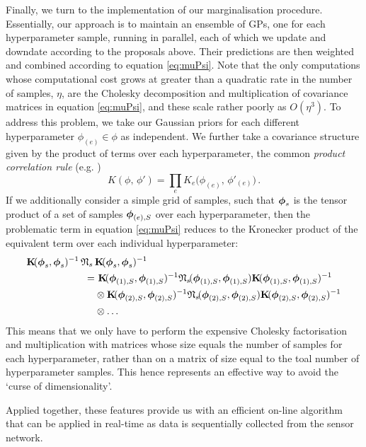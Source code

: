 \documentclass{acmtrans2m}
\begin{document}
Finally, we turn to the implementation of our marginalisation procedure. Essentially, our approach is to maintain an ensemble of GPs, one for each hyperparameter sample, running in parallel, each of which we update and downdate according to the proposals above. Their predictions are then weighted and combined according to equation \eqref{eq:muPsi}. Note that the only computations whose computational cost grows at greater than a quadratic rate in the number of samples, $\eta$, are the Cholesky decomposition and multiplication of covariance matrices in equation \eqref{eq:muPsi}, and these scale rather poorly as $O(\eta^3)$. To address this problem, we take our Gaussian priors for each different hyperparameter $\phi_{(e)} \in \phi$ as independent. We further take a covariance structure given by the product of terms over each hyperparameter, the common \emph{product correlation rule} (e.g. )
\begin{equation}
 K(\phi,\,\phi')=\prod_e K_e\Big(\phi_{(e)},\,\phi'_{(e)}\Big)\,.
\end{equation}
If we additionally consider a simple grid of samples, such that $\boldsymbol{\phi}_s$ is the tensor product of a set of samples $\boldsymbol{\phi}_{(e),S}$ over each hyperparameter, then the problematic term in equation \eqref{eq:muPsi} reduces to the Kronecker product of the equivalent term over each individual hyperparameter:
\begin{align}\label{eq:KNK}
\mat{K} \!(\vph_s,\vph_s)^{-1}\,\Nt\,&\mat{K}\!(\vph_s,\vph_s)^{-1}\nonumber\\
 = & ~\mat{K}\!(\vph_{(1),S},\vph_{(1),S})^{-1}\Nt\!(\vph_{(1),S},\vph_{(1),S})\mat{K}\!(\vph_{(1),S},\vph_{(1),S})^{-1}\nonumber\\ & \otimes \mat{K}\!(\vph_{(2),S},\vph_{(2),S})^{-1}\Nt\!(\vph_{(2),S},\vph_{(2),S})\mat{K}\!(\vph_{(2),S},\vph_{(2),S})^{-1}\nonumber\\ & \otimes \ldots
\end{align}
This means that we only have to perform the expensive Cholesky factorisation and multiplication with matrices whose size equals the number of samples for each hyperparameter, rather than on a matrix of size equal to the toal number of hyperparameter samples. This hence represents an effective way to avoid the `curse of dimensionality'. 

Applied together, these features provide us with an efficient on-line algorithm that can be applied in real-time as data is sequentially collected from the sensor network.
\end{document}

